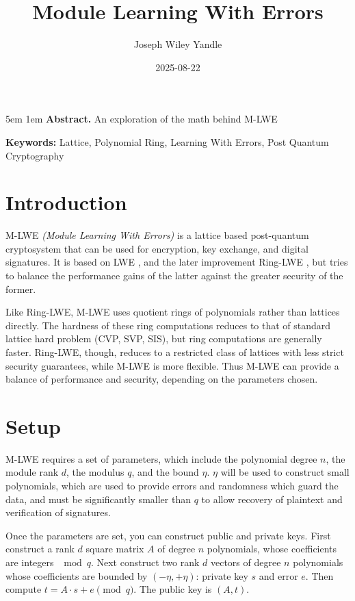 \documentclass{article}
\title{Module Learning With Errors}
\date{2025-08-22}
\author{Joseph Wiley Yandle}
\begin{document}
\onecolumn
\maketitle

\begingroup
\leftskip5em
\parskip1em
\rightskip\leftskip
\noindent\textbf{Abstract.} An exploration of the math behind M-LWE

\par
\noindent\textbf{Keywords:} Lattice, Polynomial Ring, Learning With Errors, Post Quantum Cryptography
\par
\endgroup

\section{
  Introduction
}

M-LWE \emph{(Module Learning With Errors)} \cite{mlwe} is a lattice based post-quantum cryptosystem that can be used for encryption, key exchange, and digital signatures.  It is based on LWE \cite{lwe}, and the later improvement Ring-LWE \cite{ringlwe}, but tries to balance the performance gains of the latter against the greater security of the former.

Like Ring-LWE, M-LWE uses quotient rings of polynomials rather than lattices directly.  The hardness of these ring computations reduces to that of standard lattice hard problem (CVP, SVP, SIS), but ring computations are generally faster.  Ring-LWE, though, reduces to a restricted class of lattices with less strict security guarantees, while M-LWE is more flexible.  Thus M-LWE can provide a balance of performance and security, depending on the parameters chosen.

\section{
  Setup
}

M-LWE requires a set of parameters, which include the polynomial degree $n$, the module rank $d$, the modulus $q$, and the bound $\eta$.  $\eta$ will be used to construct small polynomials, which are used to provide errors and randomness which guard the data, and must be significantly smaller than $q$ to allow recovery of plaintext and verification of signatures.

Once the parameters are set, you can construct public and private keys.  First construct a rank $d$ square matrix $A$ of degree $n$ polynomials, whose coefficients are integers $\mod{q}$.  Next construct two rank $d$ vectors of degree $n$ polynomials whose coefficients are bounded by $(-\eta, +\eta)$: private key $s$ and error $e$.  Then compute $t = A \cdot s + e \pmod{q}$.  The public key is $(A, t)$.
\end{document}
